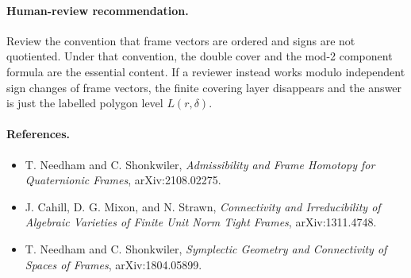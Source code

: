 \documentclass[11pt]{article}
\begin{document}
\paragraph{Human-review recommendation.}
Review the convention that frame vectors are ordered and signs are not quotiented. Under that convention, the double cover and the mod-2 component formula are the essential content. If a reviewer instead works modulo independent sign changes of frame vectors, the finite covering layer disappears and the answer is just the labelled polygon level \(L(r,\delta)\).

\paragraph{References.}
\begin{itemize}
\item T. Needham and C. Shonkwiler, \emph{Admissibility and Frame Homotopy for Quaternionic Frames}, arXiv:2108.02275.
\item J. Cahill, D. G. Mixon, and N. Strawn, \emph{Connectivity and Irreducibility of Algebraic Varieties of Finite Unit Norm Tight Frames}, arXiv:1311.4748.
\item T. Needham and C. Shonkwiler, \emph{Symplectic Geometry and Connectivity of Spaces of Frames}, arXiv:1804.05899.
\end{itemize}
\end{document}
